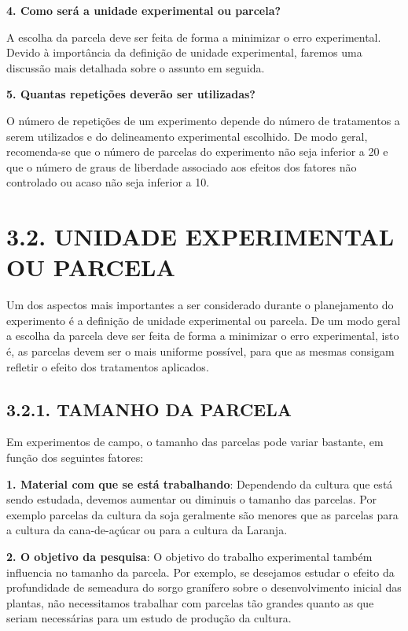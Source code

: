 \documentclass[
]{book}
\begin{document}
\textbf{4. Como será a unidade experimental ou parcela?}

A escolha da parcela deve ser feita de forma a minimizar o erro experimental. Devido à importância da definição de unidade experimental, faremos uma discussão mais detalhada sobre o assunto em seguida.

\textbf{5. Quantas repetições deverão ser utilizadas?}

O número de repetições de um experimento depende do número de tratamentos a serem utilizados e do delineamento experimental escolhido. De modo geral, recomenda-se que o número de parcelas do experimento não seja inferior a 20 e que o número de graus de liberdade associado aos efeitos dos fatores não controlado ou acaso não seja inferior a 10.

\hypertarget{unidade-experimental-ou-parcela}{%
\section{3.2. UNIDADE EXPERIMENTAL OU PARCELA}\label{unidade-experimental-ou-parcela}}

Um dos aspectos mais importantes a ser considerado durante o planejamento do experimento é a definição de unidade experimental ou parcela. De um modo geral a escolha da parcela deve ser feita de forma a minimizar o erro experimental, isto é, as parcelas devem ser o mais uniforme possível, para que as mesmas consigam refletir o efeito dos tratamentos aplicados.

\hypertarget{tamanho-da-parcela}{%
\subsection{3.2.1. TAMANHO DA PARCELA}\label{tamanho-da-parcela}}

Em experimentos de campo, o tamanho das parcelas pode variar bastante, em função dos seguintes fatores:

\textbf{1. Material com que se está trabalhando}: Dependendo da cultura que está sendo estudada, devemos aumentar ou diminuis o tamanho das parcelas. Por exemplo parcelas da cultura da soja geralmente são menores que as parcelas para a cultura da cana-de-açúcar ou para a cultura da Laranja.

\textbf{2. O objetivo da pesquisa}: O objetivo do trabalho experimental também influencia no tamanho da parcela. Por exemplo, se desejamos estudar o efeito da profundidade de semeadura do sorgo granífero sobre o desenvolvimento inicial das plantas, não necessitamos trabalhar com parcelas tão grandes quanto as que seriam necessárias para um estudo de produção da cultura.
\end{document}
